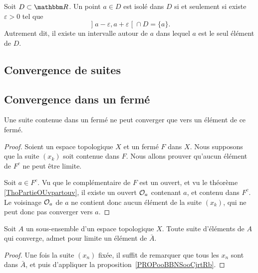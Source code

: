 \begin{lemma}
    Soit $D\subset\eR$. Un point $a\in D$ est isolé dans $D$ si et seulement si existe $\varepsilon>0$ tel que
    \begin{equation}
        \mathopen] a-\varepsilon , a+\varepsilon \mathclose[\cap D=\{ a \}.
    \end{equation}
    Autrement dit, il existe un intervalle autour de $a$ dans lequel $a$ est le seul élément de $D$.
\end{lemma}

\subsection{Convergence de suites}

\subsection{Convergence dans un fermé}


\begin{proposition}      \label{PROPooBBNSooCjrtRb}
    Une suite contenue dans un fermé ne peut converger que vers un élément de ce fermé.
\end{proposition}

\begin{proof}
    Soient un espace topologique \( X\) et un fermé \( F\) dans \( X\). Nous supposons que la suite \( (x_k)\) soit contenue dans \( F\). Nous allons prouver qu'aucun élément de \( F^c\) ne peut être limite.

    Soit \( a \in F^c\). Vu que le complémentaire de \( F\) est un ouvert, et vu le théorème \ref{ThoPartieOUvpartouv}, il existe un ouvert \( \mathcal{O}_a\) contenant \( a\), et contenu dans \( F^c\). Le voisinage \( \mathcal{O}_a\) de \( a\) ne contient donc aucun élément de la suite \( (x_k)\), qui ne peut donc pas converger vers \( a\).
\end{proof}

\begin{corollary}\label{CorLimAbarA}
  Soit \( A \) un sous-ensemble d'un espace topologique \(X \). Toute suite d'éléments de \(A \) qui converge, admet pour limite un élément de \( \bar A \).
\end{corollary}
\begin{proof}
  Une fois la suite \( (x_n) \) fixée, il suffit de remarquer que tous les \( x_n \) sont dans \( \bar A \), et puis d'appliquer la proposition~\ref{PROPooBBNSooCjrtRb}. 
\end{proof}


